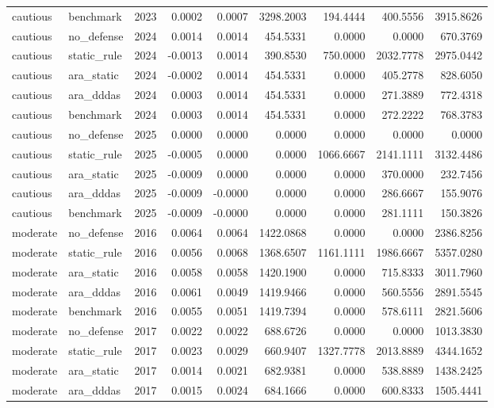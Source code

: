 \begin{tabular}{llrrrrrrr}
cautious & benchmark & 2023 & 0.0002 & 0.0007 & 3298.2003 & 194.4444 & 400.5556 & 3915.8626 \\
cautious & no_defense & 2024 & 0.0014 & 0.0014 & 454.5331 & 0.0000 & 0.0000 & 670.3769 \\
cautious & static_rule & 2024 & -0.0013 & 0.0014 & 390.8530 & 750.0000 & 2032.7778 & 2975.0442 \\
cautious & ara_static & 2024 & -0.0002 & 0.0014 & 454.5331 & 0.0000 & 405.2778 & 828.6050 \\
cautious & ara_dddas & 2024 & 0.0003 & 0.0014 & 454.5331 & 0.0000 & 271.3889 & 772.4318 \\
cautious & benchmark & 2024 & 0.0003 & 0.0014 & 454.5331 & 0.0000 & 272.2222 & 768.3783 \\
cautious & no_defense & 2025 & 0.0000 & 0.0000 & 0.0000 & 0.0000 & 0.0000 & 0.0000 \\
cautious & static_rule & 2025 & -0.0005 & 0.0000 & 0.0000 & 1066.6667 & 2141.1111 & 3132.4486 \\
cautious & ara_static & 2025 & -0.0009 & 0.0000 & 0.0000 & 0.0000 & 370.0000 & 232.7456 \\
cautious & ara_dddas & 2025 & -0.0009 & -0.0000 & 0.0000 & 0.0000 & 286.6667 & 155.9076 \\
cautious & benchmark & 2025 & -0.0009 & -0.0000 & 0.0000 & 0.0000 & 281.1111 & 150.3826 \\
moderate & no_defense & 2016 & 0.0064 & 0.0064 & 1422.0868 & 0.0000 & 0.0000 & 2386.8256 \\
moderate & static_rule & 2016 & 0.0056 & 0.0068 & 1368.6507 & 1161.1111 & 1986.6667 & 5357.0280 \\
moderate & ara_static & 2016 & 0.0058 & 0.0058 & 1420.1900 & 0.0000 & 715.8333 & 3011.7960 \\
moderate & ara_dddas & 2016 & 0.0061 & 0.0049 & 1419.9466 & 0.0000 & 560.5556 & 2891.5545 \\
moderate & benchmark & 2016 & 0.0055 & 0.0051 & 1419.7394 & 0.0000 & 578.6111 & 2821.5606 \\
moderate & no_defense & 2017 & 0.0022 & 0.0022 & 688.6726 & 0.0000 & 0.0000 & 1013.3830 \\
moderate & static_rule & 2017 & 0.0023 & 0.0029 & 660.9407 & 1327.7778 & 2013.8889 & 4344.1652 \\
moderate & ara_static & 2017 & 0.0014 & 0.0021 & 682.9381 & 0.0000 & 538.8889 & 1438.2425 \\
moderate & ara_dddas & 2017 & 0.0015 & 0.0024 & 684.1666 & 0.0000 & 600.8333 & 1505.4441 \\

\end{tabular}
